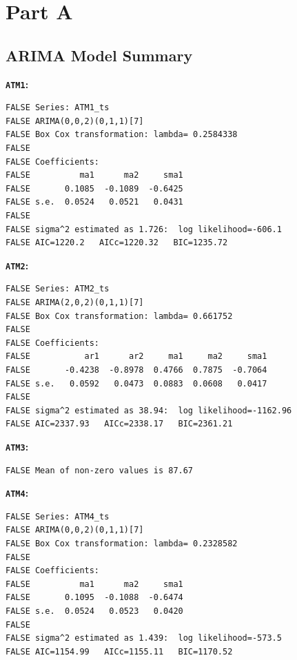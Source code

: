 \documentclass[openany]{book}
\begin{document}
\hypertarget{Part-A}{%
\section*{Part A}\label{Part-A}}

\hypertarget{Part-A-arima}{%
\subsection*{ARIMA Model Summary}\label{Part-A-arima}}

\textbf{\texttt{ATM1}:}

\begin{verbatim}
FALSE Series: ATM1_ts 
FALSE ARIMA(0,0,2)(0,1,1)[7] 
FALSE Box Cox transformation: lambda= 0.2584338 
FALSE 
FALSE Coefficients:
FALSE          ma1      ma2     sma1
FALSE       0.1085  -0.1089  -0.6425
FALSE s.e.  0.0524   0.0521   0.0431
FALSE 
FALSE sigma^2 estimated as 1.726:  log likelihood=-606.1
FALSE AIC=1220.2   AICc=1220.32   BIC=1235.72
\end{verbatim}

\textbf{\texttt{ATM2}:}

\begin{verbatim}
FALSE Series: ATM2_ts 
FALSE ARIMA(2,0,2)(0,1,1)[7] 
FALSE Box Cox transformation: lambda= 0.661752 
FALSE 
FALSE Coefficients:
FALSE           ar1      ar2     ma1     ma2     sma1
FALSE       -0.4238  -0.8978  0.4766  0.7875  -0.7064
FALSE s.e.   0.0592   0.0473  0.0883  0.0608   0.0417
FALSE 
FALSE sigma^2 estimated as 38.94:  log likelihood=-1162.96
FALSE AIC=2337.93   AICc=2338.17   BIC=2361.21
\end{verbatim}

\textbf{\texttt{ATM3}:}

\begin{verbatim}
FALSE Mean of non-zero values is 87.67
\end{verbatim}

\textbf{\texttt{ATM4}:}

\begin{verbatim}
FALSE Series: ATM4_ts 
FALSE ARIMA(0,0,2)(0,1,1)[7] 
FALSE Box Cox transformation: lambda= 0.2328582 
FALSE 
FALSE Coefficients:
FALSE          ma1      ma2     sma1
FALSE       0.1095  -0.1088  -0.6474
FALSE s.e.  0.0524   0.0523   0.0420
FALSE 
FALSE sigma^2 estimated as 1.439:  log likelihood=-573.5
FALSE AIC=1154.99   AICc=1155.11   BIC=1170.52
\end{verbatim}
\end{document}
